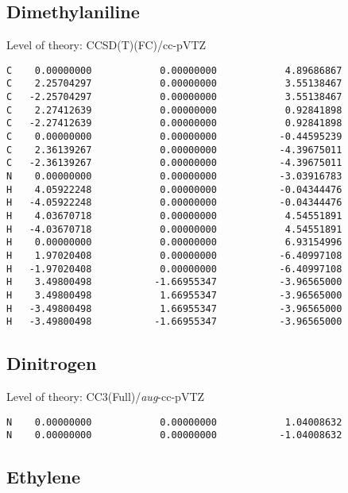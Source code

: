 \documentclass[journal=jctcce,manuscript=article,layout=traditional]{achemso}
\newcommand{\TZ}{cc-pVTZ}
\newcommand{\AVTZ}{\emph{aug}-cc-pVTZ}
\begin{document}
\subsection*{Dimethylaniline}

\begin{singlespace}
Level of theory: CCSD(T)(FC)/{\TZ}
\begin{verbatim}
C    0.00000000            0.00000000            4.89686867
C    2.25704297            0.00000000            3.55138467
C   -2.25704297            0.00000000            3.55138467
C    2.27412639            0.00000000            0.92841898
C   -2.27412639            0.00000000            0.92841898
C    0.00000000            0.00000000           -0.44595239
C    2.36139267            0.00000000           -4.39675011
C   -2.36139267            0.00000000           -4.39675011
N    0.00000000            0.00000000           -3.03916783
H    4.05922248            0.00000000           -0.04344476
H   -4.05922248            0.00000000           -0.04344476
H    4.03670718            0.00000000            4.54551891
H   -4.03670718            0.00000000            4.54551891
H    0.00000000            0.00000000            6.93154996
H    1.97020408            0.00000000           -6.40997108
H   -1.97020408            0.00000000           -6.40997108
H    3.49800498           -1.66955347           -3.96565000
H    3.49800498            1.66955347           -3.96565000
H   -3.49800498            1.66955347           -3.96565000
H   -3.49800498           -1.66955347           -3.96565000
\end{verbatim}
\end{singlespace}


\subsection*{Dinitrogen}

\begin{singlespace}
Level of theory: CC3(Full)/{\AVTZ}
\begin{verbatim}
N    0.00000000            0.00000000            1.04008632
N    0.00000000            0.00000000           -1.04008632
\end{verbatim}
\end{singlespace}

\subsection*{Ethylene}
\end{document}
